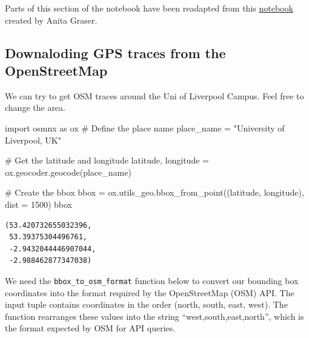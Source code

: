 \documentclass[
  letterpaper,
  DIV=11,
  numbers=noendperiod]{scrreprt}
\newenvironment{Shaded}{\begin{snugshade}}{\end{snugshade}}
\newcommand{\CommentTok}[1]{\textcolor[rgb]{0.37,0.37,0.37}{#1}}
\newcommand{\DecValTok}[1]{\textcolor[rgb]{0.68,0.00,0.00}{#1}}
\newcommand{\ImportTok}[1]{\textcolor[rgb]{0.00,0.46,0.62}{#1}}
\newcommand{\NormalTok}[1]{\textcolor[rgb]{0.00,0.23,0.31}{#1}}
\newcommand{\OperatorTok}[1]{\textcolor[rgb]{0.37,0.37,0.37}{#1}}
\newcommand{\StringTok}[1]{\textcolor[rgb]{0.13,0.47,0.30}{#1}}
\begin{document}
Parts of this section of the notebook have been readapted from this
\href{https://github.com/movingpandas/movingpandas-examples/blob/main/2-analysis-examples/osm-traces.ipynb}{notebook}
created by Anita Graser.

\subsection{Downaloding GPS traces from the
OpenStreetMap}\label{downaloding-gps-traces-from-the-openstreetmap}

We can try to get OSM traces around the Uni of Liverpool Campus. Feel
free to change the area.

\begin{Shaded}
\begin{Highlighting}[]
\ImportTok{import}\NormalTok{ osmnx }\ImportTok{as}\NormalTok{ ox}
\CommentTok{\# Define the place name}
\NormalTok{place\_name }\OperatorTok{=} \StringTok{"University of Liverpool, UK"}

\CommentTok{\# Get the latitude and longitude}
\NormalTok{latitude, longitude }\OperatorTok{=}\NormalTok{ ox.geocoder.geocode(place\_name)}

\CommentTok{\# Create the bbox}
\NormalTok{bbox }\OperatorTok{=}\NormalTok{ ox.utils\_geo.bbox\_from\_point((latitude, longitude), dist }\OperatorTok{=} \DecValTok{1500}\NormalTok{)}
\NormalTok{bbox}
\end{Highlighting}
\end{Shaded}

\begin{verbatim}
(53.420732655032396,
 53.39375304496761,
 -2.9432044446907044,
 -2.988462877347038)
\end{verbatim}

We need the \texttt{bbox\_to\_osm\_format} function below to convert our
bounding box coordinates into the format required by the OpenStreetMap
(OSM) API. The input tuple contains coordinates in the order (north,
south, east, west). The function rearranges these values into the string
``west,south,east,north'', which is the format expected by OSM for API
queries.
\end{document}
